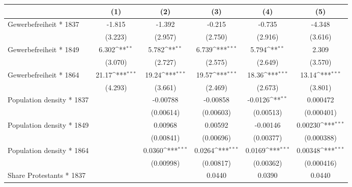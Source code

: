 {
\def\sym#1{\ifmmode^{#1}\else\(^{#1}\)\fi}
\begin{tabular}{l*{5}{c}}
\hline\hline
                    &\multicolumn{1}{c}{(1)}         &\multicolumn{1}{c}{(2)}         &\multicolumn{1}{c}{(3)}         &\multicolumn{1}{c}{(4)}         &\multicolumn{1}{c}{(5)}         \\
\hline
Gewerbefreiheit * 1837&      -1.815         &      -1.392         &      -0.215         &      -0.735         &      -4.348         \\
                    &     (3.223)         &     (2.957)         &     (2.750)         &     (2.916)         &     (3.616)         \\
Gewerbefreiheit * 1849&       6.302\sym{**} &       5.782\sym{**} &       6.739\sym{***}&       5.794\sym{**} &       2.309         \\
                    &     (3.070)         &     (2.727)         &     (2.575)         &     (2.649)         &     (3.570)         \\
Gewerbefreiheit * 1864&       21.17\sym{***}&       19.24\sym{***}&       19.57\sym{***}&       18.36\sym{***}&       13.14\sym{***}\\
                    &     (4.293)         &     (3.661)         &     (2.469)         &     (2.673)         &     (3.801)         \\
Population density * 1837&                     &    -0.00788         &    -0.00858         &     -0.0126\sym{**} &    0.000472         \\
                    &                     &   (0.00614)         &   (0.00603)         &   (0.00513)         &  (0.000401)         \\
Population density * 1849&                     &     0.00968         &     0.00592         &    -0.00146         &     0.00230\sym{***}\\
                    &                     &   (0.00841)         &   (0.00696)         &   (0.00377)         &  (0.000388)         \\
Population density * 1864&                     &      0.0360\sym{***}&      0.0264\sym{***}&      0.0169\sym{***}&     0.00348\sym{***}\\
                    &                     &   (0.00998)         &   (0.00817)         &   (0.00362)         &  (0.000416)         \\
Share Protestants * 1837&                     &                     &      0.0440         &      0.0390         &      0.0440         \\

\end{tabular}}
